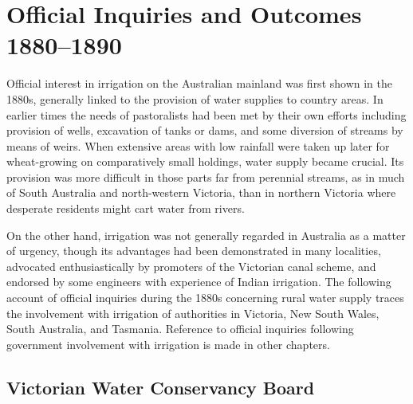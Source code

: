 
\setcounter{endnote}{0}

\chapter{Official Inquiries and Outcomes 1880--1890}
\label{ch:inquiries}


Official interest in irrigation on the Australian mainland was first
sh\-own in the 1880s, generally linked to the provision of water
supplies to country areas.  In earlier times the needs of pastoralists
had been met by their own efforts including provision of wells,
excavation of tanks or dams, and some diversion of streams by means of
weirs.  When extensive areas with low rainfall were taken up later for
wheat-growing on comparatively small holdings, water supply became
crucial.  Its provision was more difficult in those parts far from
perennial streams, as in much of South Australia and north-western
Victoria, than in northern Victoria where desperate residents might
cart water from rivers.

On the other hand, irrigation was not generally regarded in Australia
as a matter of urgency, though its advantages had been demonstrated in
many localities, advocated enthusiastically by promoters of the
Victorian canal scheme, and endorsed by some engineers with experience
of Indian irrigation.  The following account of official inquiries
during the 1880s concerning rural water supply traces the involvement
with irrigation of authorities in Victoria, New South Wales, South
Australia, and Tasmania.  Reference to official inquiries following
government involvement with irrigation is made in other chapters.

\section*{Victorian Water Conservancy Board}

